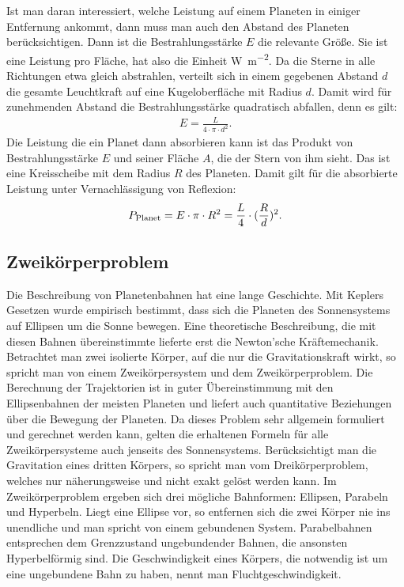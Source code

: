 Ist man daran interessiert, welche Leistung auf einem Planeten in einiger Entfernung ankommt, dann muss man auch den Abstand des Planeten berücksichtigen. Dann ist die Bestrahlungsstärke $E$ die relevante Größe. Sie ist eine Leistung pro Fläche, hat also die Einheit \unit{\watt \per \meter \squared}. Da die Sterne in alle Richtungen etwa gleich abstrahlen, verteilt sich in einem gegebenen Abstand $d$ die gesamte Leuchtkraft auf eine Kugeloberfläche mit Radius $d$. Damit wird für zunehmenden Abstand die Bestrahlungsstärke quadratisch abfallen, denn es gilt:
\begin{align*}
	E= \frac{L}{4\cdot\pi\cdot d^2}.
\end{align*}
Die Leistung die ein Planet dann absorbieren kann ist das Produkt von Bestrahlungsstärke $E$ und seiner Fläche $A$, die der Stern von ihm sieht. Das ist eine Kreisscheibe mit dem Radius $R$ des Planeten. Damit gilt für die absorbierte Leistung unter Vernachlässigung von Reflexion:
\begin{align*}
	P_{\text{Planet}}=E\cdot \pi \cdot R^2= \frac{L}{4}\cdot \relax(\frac{R}{d})^2.
\end{align*}


\subsection{Zweikörperproblem}

Die Beschreibung von Planetenbahnen hat eine lange Geschichte. Mit Keplers Gesetzen wurde empirisch bestimmt, dass sich die Planeten des Sonnensystems auf Ellipsen um die Sonne bewegen. Eine theoretische Beschreibung, die mit diesen Bahnen übereinstimmte lieferte erst die Newton'sche Kräftemechanik. Betrachtet man zwei isolierte Körper, auf die nur die Gravitationskraft wirkt, so spricht man von einem Zweikörpersystem und dem Zweikörperproblem. Die Berechnung der Trajektorien ist in guter Übereinstimmung mit den Ellipsenbahnen der meisten Planeten und liefert auch quantitative Beziehungen über die Bewegung der Planeten. Da dieses Problem sehr allgemein formuliert und gerechnet werden kann, gelten die erhaltenen Formeln für alle Zweikörpersysteme auch jenseits des Sonnensystems. Berücksichtigt man die Gravitation eines dritten Körpers, so spricht man vom Dreikörperproblem, welches nur näherungsweise und nicht exakt gelöst werden kann. Im Zweikörperproblem ergeben sich drei mögliche Bahnformen: Ellipsen, Parabeln und Hyperbeln. Liegt eine Ellipse vor, so entfernen sich die zwei Körper nie ins unendliche und man spricht von einem gebundenen System. Parabelbahnen entsprechen dem Grenzzustand ungebundender Bahnen, die ansonsten Hyperbelförmig sind. Die Geschwindigkeit eines Körpers, die notwendig ist um eine ungebundene Bahn zu haben, nennt man Fluchtgeschwindigkeit.

